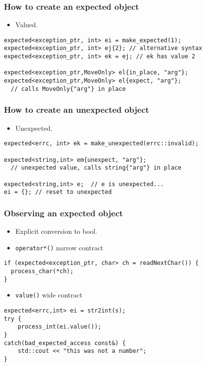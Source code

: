 \documentclass[xcolor=dvipsnames]{beamer}
\newcommand{\cpp}[1]{\lstinline{#1}}
\begin{document}
\begin{frame}[fragile]
\frametitle{How to create an expected object}

\begin{itemize}
\item Valued.
\end{itemize}

\begin{lstlisting}
expected<exception_ptr, int> ei = make_expected(1); 
expected<exception_ptr, int> ej{2}; // alternative syntax
expected<exception_ptr, int> ek = ej; // ek has value 2

expected<exception_ptr,MoveOnly> el{in_place, "arg"};        
expected<exception_ptr,MoveOnly> el{expect, "arg"};        
  // calls MoveOnly{"arg"} in place
\end{lstlisting}

\end{frame}
\begin{frame}[fragile]
\frametitle{How to create an unexpected object}

\begin{itemize}
\item Unexpected.
\end{itemize}

\begin{lstlisting}
expected<errc, int> ek = make_unexpected(errc::invalid);

expected<string,int> em{unexpect, "arg"};        
  // unexpected value, calls string{"arg"} in place

expected<string,int> e;  // e is unexpected...
ei = {}; // reset to unexpected
\end{lstlisting}

\end{frame}

\begin{frame}[fragile]
\frametitle{Observing an expected object}

\begin{itemize}
\item Explicit conversion to bool.
\item \cpp{operator*()} narrow contract
\end{itemize}

\begin{lstlisting}
if (expected<exception_ptr, char> ch = readNextChar()) {
  process_char(*ch);
}
\end{lstlisting}

\begin{itemize}
\item \cpp{value()} wide contract
\end{itemize}

\begin{lstlisting}
expected<errc,int> ei = str2int(s);
try {
    process_int(ei.value());
} 
catch(bad_expected_access const&) {
    std::cout << "this was not a number";
}
\end{lstlisting}

\end{frame}
\end{document}
